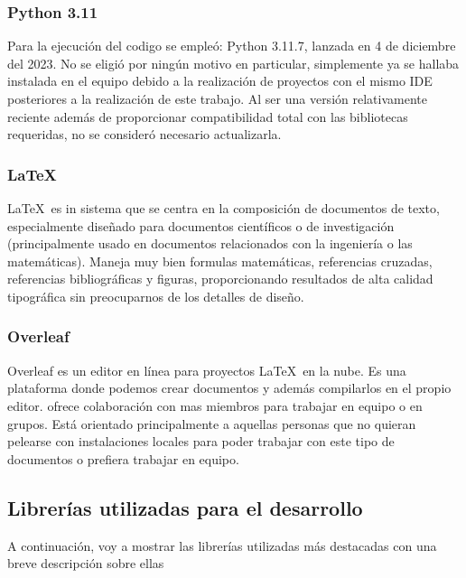 \subsubsection{Python 3.11}


Para la ejecución del codigo se empleó: Python 3.11.7, lanzada en 4 de diciembre del 2023. No se eligió por ningún motivo en particular, simplemente ya se hallaba instalada en el equipo debido a la realización de proyectos con el mismo IDE posteriores a la realización de este trabajo. Al ser una versión relativamente reciente además de proporcionar compatibilidad total con las bibliotecas requeridas, no se consideró necesario actualizarla.

\subsubsection{\LaTeX}


\LaTeX\ es in sistema que se centra en la composición de documentos de texto, especialmente diseñado para documentos científicos o de investigación (principalmente usado en documentos relacionados con la ingeniería o las matemáticas). Maneja muy bien formulas matemáticas, referencias cruzadas, referencias bibliográficas y figuras, proporcionando resultados de alta calidad tipográfica sin preocuparnos de los detalles de diseño. 

\subsubsection{Overleaf}


Overleaf es un editor en línea para proyectos \LaTeX\ en la nube. Es una plataforma donde podemos crear documentos y además compilarlos en el propio editor. ofrece colaboración con mas miembros para trabajar en equipo o en grupos. Está orientado principalmente a aquellas personas que no quieran pelearse con instalaciones locales para poder trabajar con este tipo de documentos o prefiera trabajar en equipo.

\subsection{Librerías utilizadas para el desarrollo}\label{librerias-utilizadas-para-el-desarrollo}
A continuación, voy a mostrar las librerías utilizadas más destacadas con una breve descripción sobre ellas

